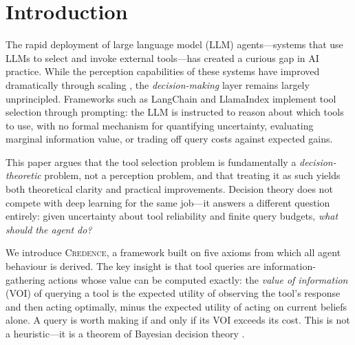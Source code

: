 \documentclass[11pt]{article}
\newcommand{\credence}{\textsc{Credence}}
\begin{document}
\section{Introduction}
\label{sec:intro}

The rapid deployment of large language model (LLM) agents---systems that use LLMs to select and invoke external tools---has created a curious gap in AI practice. While the perception capabilities of these systems have improved dramatically through scaling \citep{sutton2019bitter}, the \emph{decision-making} layer remains largely unprincipled. Frameworks such as LangChain \citep{chase2022langchain} and LlamaIndex implement tool selection through prompting: the LLM is instructed to reason about which tools to use, with no formal mechanism for quantifying uncertainty, evaluating marginal information value, or trading off query costs against expected gains.

This paper argues that the tool selection problem is fundamentally a \emph{decision-theoretic} problem, not a perception problem, and that treating it as such yields both theoretical clarity and practical improvements. Decision theory does not compete with deep learning for the same job---it answers a different question entirely: given uncertainty about tool reliability and finite query budgets, \emph{what should the agent do?}

We introduce \credence{}, a framework built on five axioms from which all agent behaviour is derived. The key insight is that tool queries are information-gathering actions whose value can be computed exactly: the \emph{value of information} (VOI) of querying a tool is the expected utility of observing the tool's response and then acting optimally, minus the expected utility of acting on current beliefs alone. A query is worth making if and only if its VOI exceeds its cost. This is not a heuristic---it is a theorem of Bayesian decision theory \citep{raiffa1961applied, degroot1984optimal}.
\end{document}
